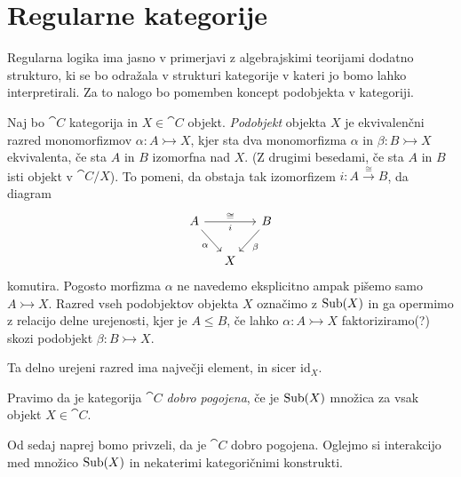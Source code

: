 \documentclass[../kategoricna_logika.tex]{subfiles}
\begin{document}
\section{Regularne kategorije}
Regularna logika ima jasno v primerjavi z algebrajskimi teorijami dodatno strukturo, ki se bo odražala v strukturi kategorije v kateri jo bomo lahko interpretirali.
Za to nalogo bo pomemben koncept podobjekta v kategoriji.
\begin{definicija}
 Naj bo $\cat{C}$ kategorija in $X \in \cat{C}$ objekt.
 \emph{Podobjekt} objekta $X$ je ekvivalenčni razred monomorfizmov $\alpha : A \rightarrowtail X$, kjer sta dva monomorfizma $\alpha$ in $\beta : B \rightarrowtail X$ ekvivalenta, če sta $A$ in $B$ izomorfna nad $X$.
 (Z drugimi besedami, če sta $A$ in $B$ isti objekt v $\cat{C}/X$). To pomeni, da obstaja tak izomorfizem $i : A \xrightarrow{\cong} B$, da diagram
 \begin{equation*}
   \begin{tikzcd}[column sep=small]
     A \ar[rr, "i"']{a}{\cong} \ar[dr, "\alpha"'] & & B \ar[dl, "\beta"] \\
     & X &
   \end{tikzcd}
 \end{equation*}
 komutira. Pogosto morfizma $\alpha$ ne navedemo eksplicitno ampak pišemo samo $A \rightarrowtail X$. 
 Razred vseh podobjektov objekta $X$ označimo z $\operatorname{Sub}(X)$ in ga opermimo z relacijo delne urejenosti, kjer je $A \leq B$, če lahko $\alpha : A \rightarrowtail X$ faktoriziramo(?) skozi podobjekt $\beta : B \rightarrowtail X$.
\end{definicija}
Ta delno urejeni razred ima največji element, in sicer $\mathrm{id}_X$.
\begin{definicija}
    Pravimo da je kategorija $\cat{C}$ \emph{dobro pogojena}, če je $\operatorname{Sub}(X)$ množica za vsak objekt $X \in \cat{C}$.
\end{definicija}
Od sedaj naprej bomo privzeli, da je $\cat{C}$ dobro pogojena. Oglejmo si interakcijo med množico $\operatorname{Sub}(X)$ in nekaterimi kategoričnimi konstrukti.
\end{document}
